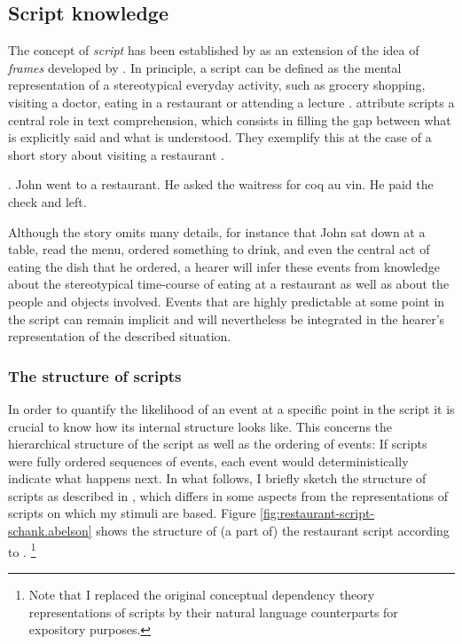 \subsection{Script knowledge} \label{sec:infotheory-scripts-scrkn}
The concept of \textit{script} has been established by \citet{schank.abelson1977} as an extension of the idea of \textit{frames} developed by \citet{minsky1974}. In principle, a script can be defined as the mental representation of a stereotypical everyday activity, such as grocery shopping, visiting a doctor, eating in a restaurant or attending a lecture \citep{bower.etal1979}. \citet{schank.abelson1977} attribute scripts a central role in text comprehension, which consists in filling the gap between what is explicitly said and what is understood. They exemplify this at the case of a short story about visiting a restaurant \Next. 

\ex. John went to a restaurant. He asked the waitress for coq au vin. He paid the check and left. \hfill \citep[38]{schank.abelson1977} \label{ex:scripts-restaurant-ex}

Although the story omits many details, for instance that John sat down at a table, read the menu, ordered something to drink, and even the central act of eating the dish that he ordered, a hearer will infer these events from knowledge about the stereotypical time-course of eating at a restaurant as well as about the people and objects involved. Events that are highly predictable at some point in the script can remain implicit and will nevertheless be integrated in the hearer's representation of the described situation.

\subsubsection{The structure of scripts}
\largerpage
In order to quantify the likelihood of an event at a specific point in the script it is crucial to know how its internal structure looks like. This concerns the hierarchical structure of the script as well as the ordering of events: If scripts were fully ordered sequences of events, each event would deterministically indicate what happens next. In what follows, I briefly sketch the structure of scripts as described in \citet{schank.abelson1977}, which differs in some aspects from the representations of scripts on which my stimuli are based. Figure \ref{fig:restaurant-script-schank.abelson} shows the structure of (a part of) the restaurant script according to \citet{schank.abelson1977}.%
% 
\footnote{Note that I replaced the original conceptual dependency theory \citep{schank1975} representations of scripts by their natural language counterparts for expository purposes.}\afterfn%
%

